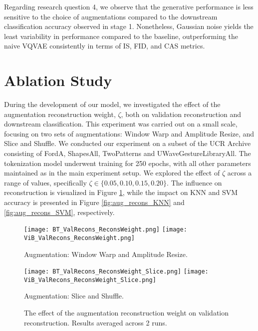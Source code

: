 \documentclass[../../thesis.tex]{subfiles}
\begin{document}
Regarding research question 4, we observe that the generative performance is less sensitive to the choice of augmentations compared to the downstream classification accuracy observed in stage 1. Nonetheless, Gaussian noise yields the least variability in performance compared to the baseline, outperforming the naive VQVAE consistently in terms of IS, FID, and CAS metrics.

\section{Ablation Study}
\label{Section:Ablation}
During the development of our model, we investigated the effect of the augmentation reconstruction weight, $\zeta$, both on validation reconstruction and downstream classification. This experiment was carried out on a small scale, focusing on two sets of augmentations: Window Warp and Amplitude Resize, and Slice and Shuffle. We conducted our experiment on a subset of the UCR Archive consisting of FordA, ShapesAll, TwoPatterns and UWaveGestureLibraryAll. The tokenization model underwent training for 250 epochs, with all other parameters maintained as in the main experiment setup. We explored the effect of $\zeta$ across a range of values, specifically $\zeta \in \{0.05, 0.10, 0.15, 0.20\}$. The influence on reconstruction is visualized in Figure \ref{fig:aug_recons_val_recons}, while the impact on KNN and SVM accuracy is presented in Figure \ref{fig:aug_recons_KNN} and \ref{fig:aug_recons_SVM}, respectively.\newline



\begin{figure}[H]
    \centering
    \begin{minipage}[b]{\textwidth}
        \centering
        \texttt{[image: BT\_ValRecons\_ReconsWeight.png]}
        \texttt{[image: ViB\_ValRecons\_ReconsWeight.png]}
    \end{minipage}
    \caption*{Augmentation: Window Warp and Amplitude Resize.}
    \begin{minipage}[b]{\textwidth}
        \centering
        \texttt{[image: BT\_ValRecons\_ReconsWeight\_Slice.png]}
        \texttt{[image: ViB\_ValRecons\_ReconsWeight\_Slice.png]}
    \end{minipage}
    \caption*{Augmentation: Slice and Shuffle.}
    \caption{The effect of the augmentation reconstruction weight on validation reconstruction. Results averaged across 2 runs.}
    \label{fig:aug_recons_val_recons}
\end{figure}
\end{document}
